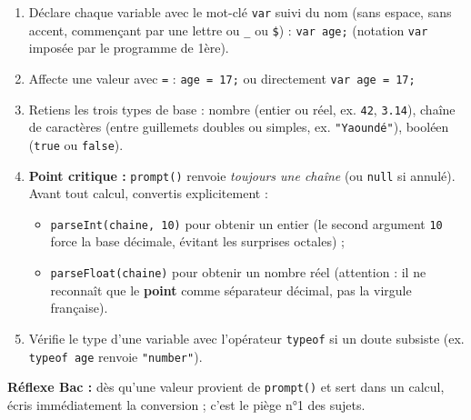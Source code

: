 \documentclass[11pt]{article}
\newcommand{\cle}[1]{{\popxbold\color{popdark}#1}}
\begin{document}
\begin{methode}
\begin{enumerate}
  \item \cle{Déclare} chaque variable avec le mot-clé \texttt{var} suivi du nom (sans espace, sans accent, commençant par une lettre ou \texttt{\_} ou \texttt{\$}) : \texttt{var age;} (notation \texttt{var} imposée par le programme de 1ère).
  \item \cle{Affecte} une valeur avec \texttt{=} : \texttt{age = 17;} ou directement \texttt{var age = 17;}
  \item Retiens les trois types de base : \cle{nombre} (entier ou réel, ex. \texttt{42}, \texttt{3.14}), \cle{chaîne de caractères} (entre guillemets doubles ou simples, ex. \texttt{"Yaoundé"}), \cle{booléen} (\texttt{true} ou \texttt{false}).
  \item \textbf{Point critique :} \texttt{prompt()} renvoie \emph{toujours une chaîne} (ou \texttt{null} si annulé). Avant tout calcul, convertis explicitement :
  \begin{itemize}
    \item \texttt{parseInt(chaine, 10)} pour obtenir un \cle{entier} (le second argument \texttt{10} force la base décimale, évitant les surprises octales) ;
    \item \texttt{parseFloat(chaine)} pour obtenir un \cle{nombre réel} (attention : il ne reconnaît que le \textbf{point} comme séparateur décimal, pas la virgule française).
  \end{itemize}
  \item Vérifie le type d'une variable avec l'opérateur \texttt{typeof} si un doute subsiste (ex. \texttt{typeof age} renvoie \texttt{"number"}).
\end{enumerate}
\textbf{Réflexe Bac :} dès qu'une valeur provient de \texttt{prompt()} et sert dans un calcul, écris immédiatement la conversion ; c'est le piège n°1 des sujets.
\end{methode}
\end{document}
